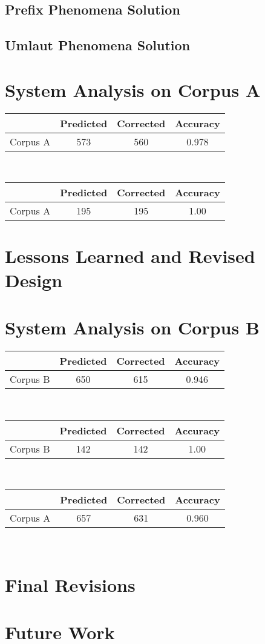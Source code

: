 \documentclass[11pt,letterpaper]{article}
\begin{document}
\subsection{Prefix Phenomena Solution}

\subsection{Umlaut Phenomena Solution}




\section{System Analysis on Corpus A}

\begin{tabular}{|c|ccc|}
\hline 
 & Predicted & Corrected & Accuracy \\ 
\hline 
Corpus A & 573 & 560 & 0.978 \\ 
\hline 
\end{tabular} 
\\
\begin{tabular}{|c|ccc|}
\hline 
 & Predicted & Corrected & Accuracy \\ 
\hline 
Corpus A & 195 & 195 & 1.00 \\ 
\hline 
\end{tabular} 

\section{Lessons Learned and Revised Design}

\section{System Analysis on Corpus B}
\begin{tabular}{|c|ccc|}
\hline 
 & Predicted & Corrected & Accuracy \\ 
\hline 
Corpus B & 650 & 615 & 0.946 \\ 
\hline 
\end{tabular} 
\\
\begin{tabular}{|c|ccc|}
\hline 
 & Predicted & Corrected & Accuracy \\ 
\hline 
Corpus B & 142 & 142 & 1.00 \\ 
\hline 
\end{tabular} 
\\
\begin{tabular}{|c|ccc|}
\hline 
 & Predicted & Corrected & Accuracy \\ 
\hline 
Corpus A & 657 & 631 & 0.960 \\ 
\hline 
\end{tabular} 
\\



\section{Final Revisions}

\section{Future Work}




\renewcommand\refname{References}




\label{lastpage}
\end{document}
